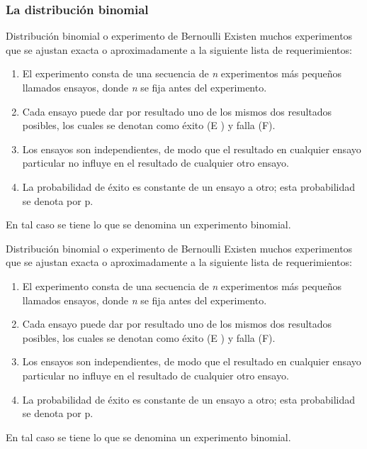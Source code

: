 \documentclass[11pt]{beamer}
\begin{document}
        \subsubsection*{La distribución binomial}
          \begin{frame}{Distribución binomial o experimento de Bernoulli}
            Existen muchos experimentos que se ajustan exacta o aproximadamente a la siguiente lista
de requerimientos:
            \begin{enumerate}
                \item El experimento consta de una secuencia de \textit{n} experimentos más pequeños llamados ensayos, donde \textit{n} se fija antes del experimento.
                \item Cada ensayo puede dar por resultado uno de los mismos dos resultados posibles, los cuales se denotan como éxito (E ) y falla (F).
                \item Los ensayos son independientes, de modo que el resultado en cualquier ensayo particular no influye en el resultado de cualquier otro ensayo.
                \item La probabilidad de éxito es constante de un ensayo a otro; esta probabilidad se denota
por p.
            \end{enumerate}
            En tal caso se tiene lo que se denomina un experimento binomial.
          \end{frame}


          \begin{frame}{Distribución binomial o experimento de Bernoulli}
              Existen muchos experimentos que se ajustan exacta o aproximadamente a la siguiente lista
de requerimientos:
              \begin{enumerate}
                  \item El experimento consta de una secuencia de \textit{n} experimentos más pequeños llamados ensayos, donde \textit{n} se fija antes del experimento.
                  \item Cada ensayo puede dar por resultado uno de los mismos dos resultados posibles, los cuales se denotan como éxito (E ) y falla (F).
                  \item Los ensayos son independientes, de modo que el resultado en cualquier ensayo particular no influye en el resultado de cualquier otro ensayo.
                  \item La probabilidad de éxito es constante de un ensayo a otro; esta probabilidad se denota
por p.
              \end{enumerate}
              En tal caso se tiene lo que se denomina un experimento binomial.
          \end{frame}
\end{document}
